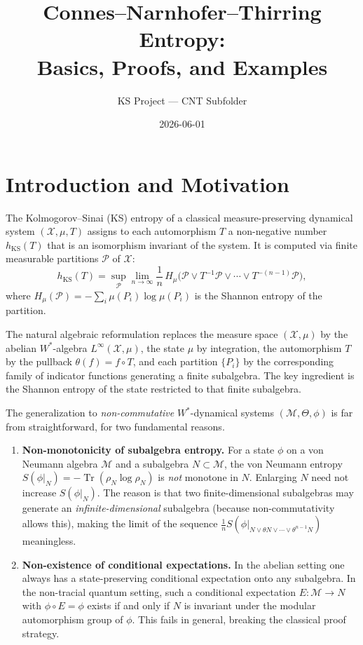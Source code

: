 \documentclass[12pt,a4paper]{article}
\title{\textbf{Connes--Narnhofer--Thirring Entropy: \\ Basics, Proofs, and Examples}}
\author{KS Project — CNT Subfolder}
\date{2026-06-01}
\newcommand{\Tr}{\operatorname{Tr}}
\newcommand{\vN}{\mathcal{M}}      %
\newcommand{\thetaaut}{\Theta}
\begin{document}
\maketitle
\tableofcontents
\newpage

\section{Introduction and Motivation}
\label{sec:intro}

The Kolmogorov--Sinai (KS) entropy of a classical measure-preserving dynamical system
$(\mathcal{X}, \mu, T)$ assigns to each automorphism $T$ a non-negative number
$h_{\mathrm{KS}}(T)$ that is an isomorphism invariant of the system.
It is computed via finite measurable partitions $\mathcal{P}$ of $\mathcal{X}$:
\begin{equation}\label{eq:ks_classical}
  h_{\mathrm{KS}}(T)
  = \sup_{\mathcal{P}} \lim_{n\to\infty}
    \frac{1}{n}\, H_\mu\!\bigl(\mathcal{P} \vee T^{-1}\mathcal{P}
                              \vee \cdots \vee T^{-(n-1)}\mathcal{P}\bigr),
\end{equation}
where $H_\mu(\mathcal{P}) = -\sum_i \mu(P_i)\log\mu(P_i)$ is the Shannon
entropy of the partition.

The natural algebraic reformulation replaces the measure space $(\mathcal{X},\mu)$ by
the abelian $W^*$-algebra $L^\infty(\mathcal{X},\mu)$, the state $\mu$ by integration,
the automorphism $T$ by the pullback $\theta(f) = f\circ T$, and each partition
$\{P_i\}$ by the corresponding family of indicator functions generating a finite
subalgebra.  The key ingredient is the Shannon entropy of the state restricted to
that finite subalgebra.

The generalization to \emph{non-commutative} $W^*$-dynamical systems $(\vN,\thetaaut,\phi)$
is far from straightforward, for two fundamental reasons.

\begin{enumerate}
\item \textbf{Non-monotonicity of subalgebra entropy.}
  For a state $\phi$ on a von Neumann algebra $\vN$ and a subalgebra $N\subset\vN$, the von
  Neumann entropy $S(\phi|_N) = -\Tr(\rho_N\log\rho_N)$ is \emph{not} monotone in $N$.
  Enlarging $N$ need not increase $S(\phi|_N)$.  The reason is that two finite-dimensional
  subalgebras may generate an \emph{infinite-dimensional} subalgebra (because
  non-commutativity allows this), making the limit of the sequence
  $\frac{1}{n}S(\phi|_{N\vee\theta N\vee\cdots\vee\theta^{n-1}N})$ meaningless.
\item \textbf{Non-existence of conditional expectations.}
  In the abelian setting one always has a state-preserving conditional expectation onto any
  subalgebra.  In the non-tracial quantum setting, such a conditional expectation
  $E:\vN\to N$ with $\phi\circ E=\phi$ exists if and only if $N$ is invariant under the
  modular automorphism group of $\phi$.  This fails in general, breaking the classical
  proof strategy.
\end{enumerate}
\end{document}
